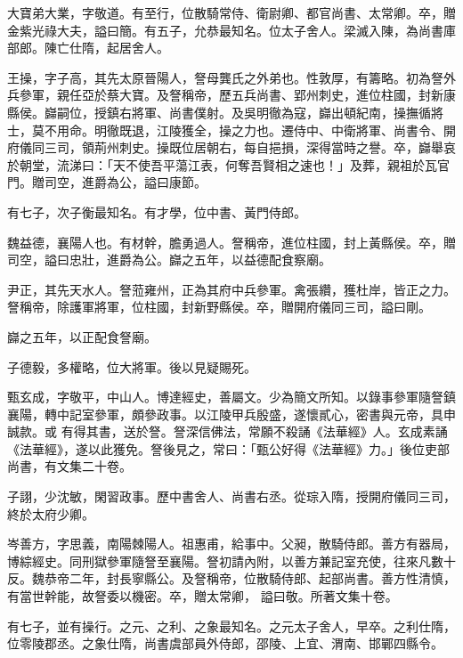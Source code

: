 \begin{pinyinscope}
 大寶弟大業，字敬道。有至行，位散騎常侍、衛尉卿、都官尚書、太常卿。卒，贈金紫光祿大夫，謚曰簡。有五子，允恭最知名。位太子舍人。梁滅入陳，為尚書庫部郎。陳亡仕隋，起居舍人。



 王操，字子高，其先太原晉陽人，詧母龔氏之外弟也。性敦厚，有籌略。初為詧外兵參軍，親任亞於蔡大寶。及詧稱帝，歷五兵尚書、郢州刺史，進位柱國，封新康縣侯。巋嗣位，授鎮右將軍、尚書僕射。及吳明徹為寇，巋出頓紀南，操撫循將士，莫不用命。明徹既退，江陵獲全，操之力也。遷侍中、中衛將軍、尚書令、開府儀同三司，領荊州刺史。操既位居朝右，每自挹損，深得當時之譽。卒，巋舉哀於朝堂，流涕曰：「天不使吾平蕩江表，何奪吾賢相之速也！」及葬，親祖於瓦官門。贈司空，進爵為公，謚曰康節。



 有七子，次子衡最知名。有才學，位中書、黃門侍郎。



 魏益德，襄陽人也。有材幹，膽勇過人。詧稱帝，進位柱國，封上黃縣侯。卒，贈司空，謚曰忠壯，進爵為公。巋之五年，以益德配食察廟。



 尹正，其先天水人。詧蒞雍州，正為其府中兵參軍。禽張纘，獲杜岸，皆正之力。詧稱帝，除護軍將軍，位柱國，封新野縣侯。卒，贈開府儀同三司，謚曰剛。



 巋之五年，以正配食詧廟。



 子德毅，多權略，位大將軍。後以見疑賜死。



 甄玄成，字敬平，中山人。博達經史，善屬文。少為簡文所知。以錄事參軍隨詧鎮襄陽，轉中記室參軍，頗參政事。以江陵甲兵殷盛，遂懷貳心，密書與元帝，具申誠款。或
 有得其書，送於詧。詧深信佛法，常願不殺誦《法華經》人。玄成素誦《法華經》，遂以此獲免。詧後見之，常曰：「甄公好得《法華經》力。」後位吏部尚書，有文集二十卷。



 子詡，少沈敏，閑習政事。歷中書舍人、尚書右丞。從琮入隋，授開府儀同三司，終於太府少卿。



 岑善方，字思義，南陽棘陽人。祖惠甫，給事中。父昶，散騎侍郎。善方有器局，博綜經史。同刑獄參軍隨詧至襄陽。詧初請內附，以善方兼記室充使，往來凡數十反。魏恭帝二年，封長寧縣公。及詧稱帝，位散騎侍郎、起部尚書。善方性清慎，有當世幹能，故詧委以機密。卒，贈太常卿，
 謚曰敬。所著文集十卷。



 有七子，並有操行。之元、之利、之象最知名。之元太子舍人，早卒。之利仕隋，位零陵郡丞。之象仕隋，尚書虞部員外侍郎，邵陵、上宜、渭南、邯鄲四縣令。




\end{pinyinscope}
